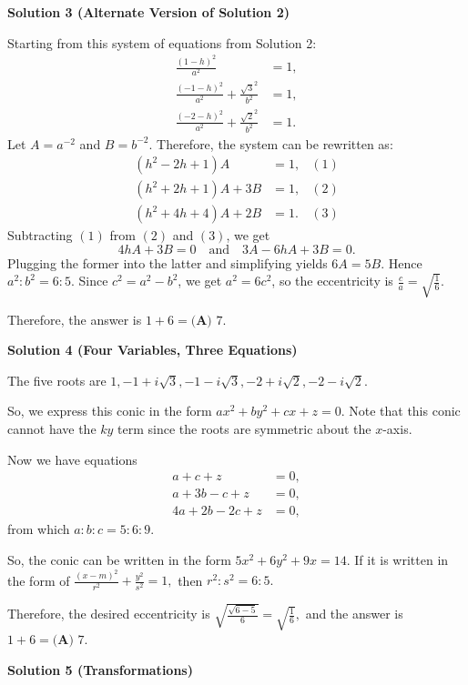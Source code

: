 \begin{enumerate}
 



\textbf{Solution 3 (Alternate Version of Solution 2)}

Starting from this system of equations from Solution 2:
 \begin{align*} \frac{(1-h)^2}{a^2}&=1, \\ \frac{(-1-h)^2}{a^2}+\frac{{\sqrt3}^2}{b^2}&=1, \\ \frac{(-2-h)^2}{a^2}+\frac{{\sqrt2}^2}{b^2}&=1. \end{align*}
Let $A=a^{-2}$ and $B=b^{-2}$. Therefore, the system can be rewritten as:
 \begin{align*} (h^2-2h+1)A&=1, &(1)\\ (h^2+2h+1)A+3B&=1, &(2)\\ (h^2+4h+4)A+2B&=1. &(3) \end{align*}
Subtracting $(1)$ from $(2)$ and $(3)$, we get
 \[4hA+3B=0\quad\text{and}\quad 3A-6hA+3B=0.\]Plugging the former into the latter and simplifying yields $6A=5B$. Hence $a^2:b^2=6:5$. Since $c^2=a^2-b^2$, we get $a^2=6c^2$, so the eccentricity is $\frac ca=\sqrt{\frac16}$.

 Therefore, the answer is $1+6=\boxed{\textbf{(A) }7}$.

 



\textbf{Solution 4 (Four Variables, Three Equations)}

The five roots are $1,-1+i\sqrt{3},-1-i\sqrt{3},-2+i\sqrt{2},-2-i\sqrt{2}.$

 So, we express this conic in the form $ax^2+by^2+cx+z=0.$ Note that this conic cannot have the $ky$ term since the roots are symmetric about the $x$-axis.

 Now we have equations
 \begin{align*} a+c+z&=0, \\ a+3b-c+z&=0, \\ 4a+2b-2c+z&=0, \end{align*}
from which $a:b:c=5:6:9.$

 So, the conic can be written in the form $5x^2+6y^2+9x=14.$ If it is written in the form of $\frac{(x-m)^2}{r^2}+\frac{y^2}{s^2}=1,$ then $r^2:s^2=6:5.$

 Therefore, the desired eccentricity is $\sqrt{\frac{\sqrt{6-5}}{6}}=\sqrt{\frac{1}{6}},$ and the answer is $1+6=\boxed{\textbf{(A) }7}.$




\textbf{Solution 5 (Transformations)}


\end{enumerate}
